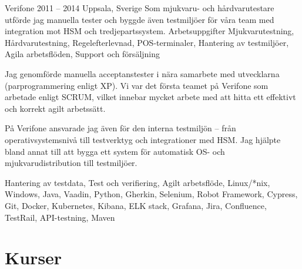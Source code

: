 \documentclass{sobCV}[2015/09/08]
\begin{document}
   {Verifone}
   {2011 -- 2014}
   {Uppsala, Sverige}{
       Som mjukvaru- och hårdvarutestare utförde jag manuella tester och byggde även testmiljöer för våra team med integration mot HSM och tredjepartssystem.
   }
   {Arbetsuppgifter}{
       Mjukvarutestning,
       Hårdvarutestning,
       Regelefterlevnad, 
       POS-terminaler,
       Hantering av testmiljöer,
       Agila arbetsflöden,
       Support och försäljning
 }{
      {
          Jag genomförde manuella acceptanstester i nära samarbete med utvecklarna (parprogrammering enligt XP). Vi var det första teamet på Verifone som arbetade enligt SCRUM, vilket innebar mycket arbete med att hitta ett effektivt och korrekt agilt arbetssätt.

          På Verifone ansvarade jag även för den interna testmiljön – från operativsystemsnivå till testverktyg och integrationer med HSM. Jag hjälpte bland annat till att bygga ett system för automatisk OS- och mjukvarudistribution till testmiljöer.
     }
 }{
       Hantering av testdata,
       Test och verifiering,
       Agilt arbetsflöde, 
       Linux/*nix, 
       Windows, 
       Java, 
       Vaadin, 
       Python, 
       Gherkin, 
       Selenium, 
       Robot Framework,
       Cypress, 
       Git, 
       Docker, 
       Kubernetes, 
       Kibana, 
       ELK stack, 
       Grafana, 
       Jira, 
       Confluence, 
       TestRail, 
       API-testning, 
       Maven 
}

\section{Kurser}


\end{document}
